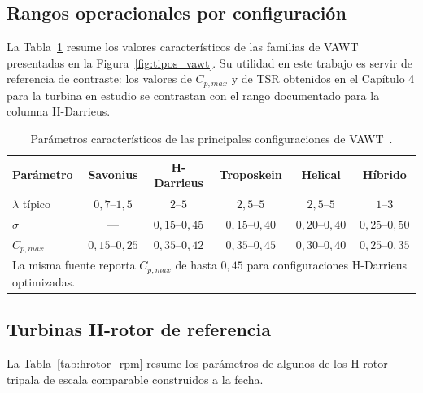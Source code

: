 \subsection{Rangos operacionales por configuración}
\label{sec:configuraciones-vawt}


La Tabla~\ref{tab:tabla_vawt} resume los valores característicos de las familias de VAWT presentadas en la Figura~\ref{fig:tipos_vawt}. Su utilidad en este trabajo es servir de referencia de contraste: los valores de $C_{p,max}$ y de TSR obtenidos en el Capítulo 4 para la turbina en estudio se contrastan con el rango documentado para la columna H-Darrieus.

\begin{table}[H]
    \centering
    \caption[Parámetros característicos de las principales configuraciones de VAWT.]{Parámetros característicos de las principales configuraciones de VAWT~\parencite{Essahraoui2026}.}
    \label{tab:tabla_vawt}
    \begin{tabular}{lccccc}
        \hline
        \textbf{Parámetro} & \textbf{Savonius} & \textbf{H-Darrieus} & \textbf{Troposkein} & \textbf{Helical} & \textbf{Híbrido}\\
        \hline
        $\lambda$ típico & $0{,}7\text{--}1{,}5$ & $2\text{--}5$ & $2{,}5\text{--}5$ & $2{,}5\text{--}5$ & $1\text{--}3$\\
        $\sigma$ & --- & $0{,}15\text{--}0{,}45$ & $0{,}15\text{--}0{,}40$ & $0{,}20\text{--}0{,}40$ & $0{,}25\text{--}0{,}50$\\
        $C_{p,max}$ & $0{,}15\text{--}0{,}25$ & $0{,}35\text{--}0{,}42$ & $0{,}35\text{--}0{,}45$ & $0{,}30\text{--}0{,}40$ & $0{,}25\text{--}0{,}35$\\
        \hline
        \multicolumn{6}{p{0.95\textwidth}}{\footnotesize La misma fuente reporta $C_{p,max}$ de hasta $0{,}45$ para configuraciones H-Darrieus optimizadas.}
    \end{tabular}
\end{table}

\subsection{Turbinas H-rotor de referencia}
\label{sec:turbinas_referencia}

La Tabla~\ref{tab:hrotor_rpm} resume los parámetros de algunos de los H-rotor tripala de escala comparable construidos a la fecha.

